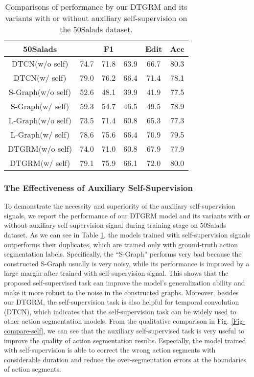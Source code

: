 \documentclass[letterpaper]{article} \usepackage{aaai21}  \usepackage{times}  \usepackage{helvet} \usepackage{courier}  \usepackage[hyphens]{url}  \usepackage{graphicx} \usepackage{mathtools}
\begin{document}
\begin{table}[htbp]
	\centering
	\caption{Comparisons of performance by our DTGRM and its variants with or without auxiliary self-supervision on the 50Salads dataset.}
	\vspace{-0.2cm}
	\begin{tabular}{cccccc}
		\hline
		\textbf{50Salads} &\multicolumn{3}{c}{\textbf{F1}} &\textbf{Edit} &\textbf{Acc} \\ 
		\hline
		DTCN(w/o self) &74.7 &71.8 &63.9 &66.7 &80.3 \\
		DTCN(w/ self) &79.0 &76.2 &66.4 &71.4 &78.1 \\
		\hline
		S-Graph(w/o self) &52.6 &48.1 &39.9 &41.9 &77.5 \\
		S-Graph(w/ self) &59.3 &54.7 &46.5 &49.5 &78.9 \\
		\hline
		L-Graph(w/o self) &73.5 &71.4 &60.8 &65.3 &77.3 \\
		L-Graph(w/ self) &78.6 &75.6 &66.4 &70.9 &79.5 \\
		\hline
		DTGRM(w/o self) &74.0 &71.0 &60.8 &67.9 &77.9\\
		DTGRM(w/ self) &79.1 &75.9 &66.1 &72.0 &80.0\\
		\hline
	\end{tabular}\label{Table-Self}
\end{table}

\subsubsection{The Effectiveness of Auxiliary Self-Supervision}
To demonstrate the necessity and superiority of the auxiliary self-supervision signals, we report the performance of our DTGRM model and its variants with or without auxiliary self-supervision signal during training stage on 50Salads dataset. As we can see in Table \ref{Table-Self}, the models trained with self-supervision signals outperforms their duplicates, which are trained only with ground-truth action segmentation labels. Specifically, the ``S-Graph'' performs very bad because the constructed S-Graph usually is very noisy, while its performance is improved by a large margin after trained with self-supervision signal. This shows that the proposed self-supervised task can improve the model's generalization ability and make it more robust to the noise in the constructed graphs. Moreover, besides our DTGRM, the self-supervision task is also helpful for temporal convolution (DTCN), which indicates that the self-supervision task can be widely used to other action segmentation models. From the qualitative comparison in Fig. \ref{Fig-compare-self}, we can see that the auxiliary self-supervised task is very useful to improve the quality of action segmentation results. Especially, the model trained with self-supervision is able to correct the wrong action segments with considerable duration and reduce the over-segmentation errors at the boundaries of action segments. 
\end{document}
